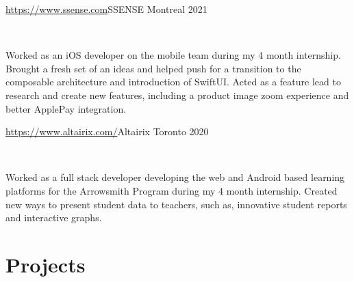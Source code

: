 \documentclass[]{style}
\begin{document}
\begin{entrylist}


\vspace{2mm}

\entry
{\url{https://www.ssense.com}{SSENSE}\vspace{1mm}}
{Montreal 2021}
{ ~ \vspace{-2.5mm}

    

Worked as an iOS developer on the mobile team during my 4 month internship. Brought a fresh set of an ideas and helped push for 
a transition to the composable architecture and introduction of SwiftUI. Acted as a feature lead to research and create new features, including a product image zoom experience and better ApplePay integration.}

%
%
%


\entry
{\url{https://www.altairix.com/}{Altairix} \vspace{1mm}}
{Toronto 2020}
{ ~ \vspace{-2.5mm}

  

Worked as a full stack developer developing the web and Android based learning platforms for the Arrowsmith Program during my 4 month internship. Created new ways to present student data to teachers, such as, innovative student reports and interactive graphs.}

\end{entrylist}



\section{Projects}
\end{document}
